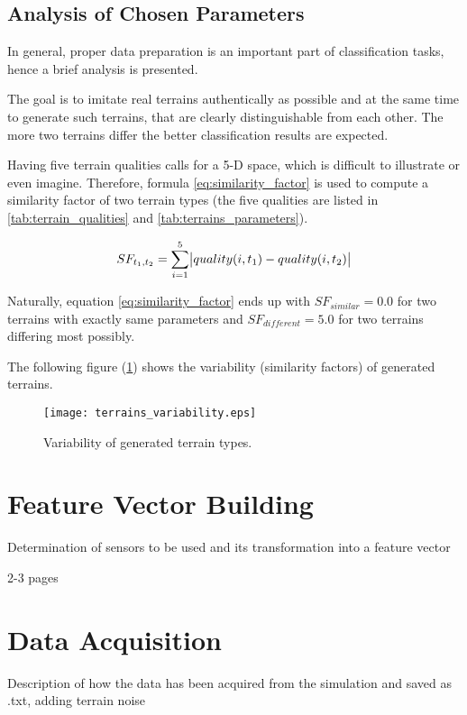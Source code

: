 \subsection{Analysis of Chosen Parameters} \label{ssec:terrains_analysis}
In general, proper data preparation is an important part of classification tasks, hence a brief analysis is presented.

The goal is to imitate real terrains authentically as possible and at the same time to generate such terrains, that are clearly distinguishable from each other. The more two terrains differ the better classification results are expected.

Having five terrain qualities calls for a 5-D space, which is difficult to illustrate or even imagine. Therefore, formula \ref{eq:similarity_factor} is used to compute a similarity factor of two terrain types (the five qualities are listed in \cref{tab:terrain_qualities} and \cref{tab:terrains_parameters}).


\begin{equation} 
\label{eq:similarity_factor}
  SF_{t_1, t_2} = \displaystyle\sum_{i=1}^{5} \abs{quality(i, t_1) - quality(i, t_2)}
\end{equation} 

Naturally, equation \ref{eq:similarity_factor} ends up with $ SF_{similar} = 0.0 $ for two terrains with exactly same parameters and $ SF_{different} = 5.0 $ for two terrains differing most possibly.

The following figure (\ref{fig:terrains_parameters}) shows the variability (similarity factors) of generated terrains.

\begin{figure}[H]
  \centering
  \texttt{[image: terrains\_variability.eps]}
  \caption{Variability of generated terrain types.}
  \label{fig:terrains_parameters}
\end{figure}


\section{Feature Vector Building} \label{sec:feature_vector_building}
Determination of sensors to be used and its transformation into a feature vector

2-3 pages

\section{Data Acquisition} \label{sec:data_acquisition}
Description of how the data has been acquired from the simulation and saved as .txt, adding terrain noise

